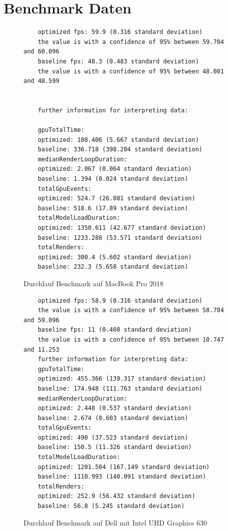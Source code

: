 \section{Benchmark Daten}
\begin{figure}[H]
  \begin{lstlisting}
    optimized fps: 59.9 (0.316 standard deviation)
    the value is with a confidence of 95% between 59.704 and 60.096
    baseline fps: 48.3 (0.483 standard deviation)
    the value is with a confidence of 95% between 48.001 and 48.599


    further information for interpreting data:

    gpuTotalTime:
    optimized: 108.406 (5.667 standard deviation)
    baseline: 336.718 (398.204 standard deviation)
    medianRenderLoopDuration:
    optimized: 2.067 (0.064 standard deviation)
    baseline: 1.394 (0.024 standard deviation)
    totalGpuEvents:
    optimized: 524.7 (26.081 standard deviation)
    baseline: 518.6 (17.89 standard deviation)
    totalModelLoadDuration:
    optimized: 1350.611 (42.677 standard deviation)
    baseline: 1233.288 (53.571 standard deviation)
    totalRenders:
    optimized: 300.4 (5.602 standard deviation)
    baseline: 232.3 (5.658 standard deviation)
  \end{lstlisting}
\caption{Durchlauf Benchmark auf MacBook Pro 2018}
\label{fig:marcbookBenchmarkRun}

\end{figure}
\begin{figure}[H]
  \begin{lstlisting}
    optimized fps: 58.9 (0.316 standard deviation)
    the value is with a confidence of 95% between 58.704 and 59.096
    baseline fps: 11 (0.408 standard deviation)
    the value is with a confidence of 95% between 10.747 and 11.253
    further information for interpreting data:
    gpuTotalTime:
    optimized: 455.366 (139.317 standard deviation)
    baseline: 174.948 (111.763 standard deviation)
    medianRenderLoopDuration:
    optimized: 2.448 (0.537 standard deviation)
    baseline: 2.674 (0.603 standard deviation)
    totalGpuEvents:
    optimized: 490 (37.523 standard deviation)
    baseline: 150.5 (11.326 standard deviation)
    totalModelLoadDuration:
    optimized: 1201.504 (167.149 standard deviation)
    baseline: 1110.993 (140.091 standard deviation)
    totalRenders:
    optimized: 252.9 (56.432 standard deviation)
    baseline: 56.8 (5.245 standard deviation)
  \end{lstlisting}
\caption{Durchlauf Benchmark auf Dell mit Intel UHD Graphics 630}
\label{fig:windowsBenchmarkRun}
\end{figure}


